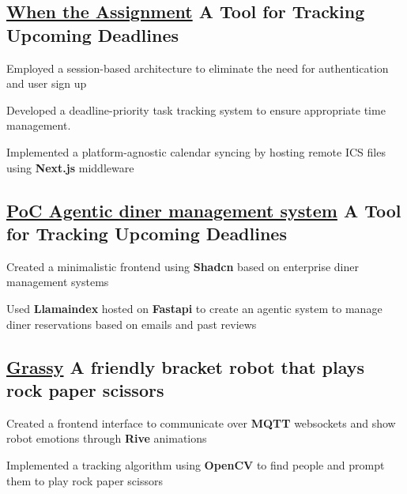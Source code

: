 \subsection{\href{https://mcwta.vercel.app/}{When the Assignment} \textbar{} A Tool for Tracking Upcoming Deadlines}
\begin{zitemize}
    \item Employed a session-based architecture to eliminate the need for authentication and user sign up
    \item Developed a deadline-priority task tracking system to ensure appropriate time management.
    \item Implemented a platform-agnostic calendar syncing by hosting remote ICS files using \textbf{Next.js} middleware
\end{zitemize}

\vspace{0.3cm}
\subsection{\href{https://agentic-dining.vercel.app/}{PoC Agentic diner management system} \textbar{} A Tool for Tracking Upcoming Deadlines}
\begin{zitemize}
    \item Created a minimalistic frontend using \textbf{Shadcn} based on enterprise diner management systems
    \item Used \textbf{Llamaindex} hosted on \textbf{Fastapi} to create an agentic system to manage diner reservations based on emails and past reviews
\end{zitemize}


\vspace{0.3cm}\subsection{\href{https://github.com/arian81/bracket-bot-controller}{Grassy} \textbar{} A friendly bracket robot that plays rock paper scissors }
\begin{zitemize}
    \item Created a frontend interface to communicate over \textbf{MQTT} websockets and show robot emotions through \textbf{Rive} animations
    \item Implemented a tracking algorithm using \textbf{OpenCV} to find people and prompt them to play rock paper scissors
\end{zitemize}



